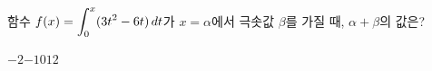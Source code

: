 함수 $f(x)=\displaystyle\int_{0}^{x} (3t^2-6t)\mkern3mu dt$가 $x=\alpha$에서 극솟값 $\beta$를 가질 때, $\alpha+\beta$의 값은?
\begin{choices32}{$-2$}{$-1$}{$0$}{$1$}{$2$}\end{choices32}
